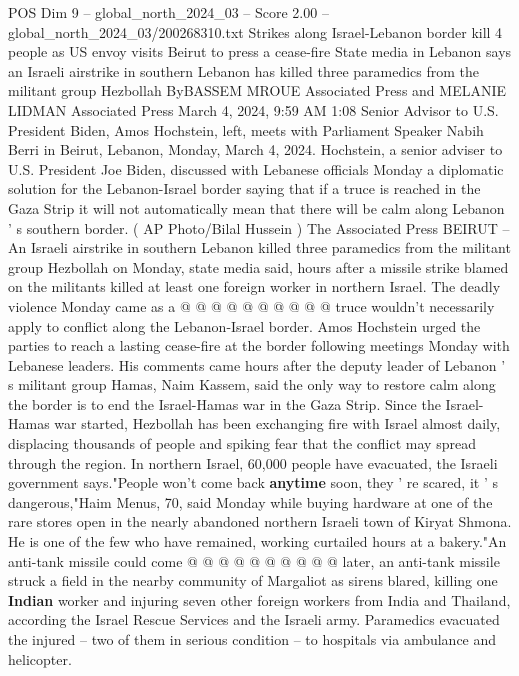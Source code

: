 \begin{textsample}{POS Dim 9 – global\_north\_2024\_03 – Score 2.00 – global\_north\_2024\_03/200268310.txt}  \label{ex:f9_pos_203}
Strikes along Israel-Lebanon border kill 4 people as US envoy visits Beirut to press a cease-fire State media in Lebanon says an Israeli airstrike in southern Lebanon has killed three paramedics from the militant group Hezbollah ByBASSEM MROUE Associated Press and MELANIE LIDMAN Associated Press March 4, 2024, 9:59 AM 1:08 Senior Advisor to U.S.
President Biden, Amos Hochstein, left, meets with Parliament Speaker Nabih Berri in Beirut, Lebanon, Monday, March 4, 2024.
Hochstein, a senior adviser to U.S.
President Joe Biden, discussed with Lebanese officials Monday a diplomatic solution for the Lebanon-Israel border saying that if a truce is reached in the Gaza Strip it will not automatically mean that there will be calm along Lebanon ' s southern border. ( AP Photo/Bilal Hussein ) The Associated Press BEIRUT -- An Israeli airstrike in southern Lebanon killed three paramedics from the militant group Hezbollah on Monday, state media said, hours after a missile strike blamed on the militants killed at least one foreign worker in northern Israel.
The deadly violence Monday came as a @ @ @ @ @ @ @ @ @ @ truce wouldn't necessarily apply to conflict along the Lebanon-Israel border.
Amos Hochstein urged the parties to reach a lasting cease-fire at the border following meetings Monday with Lebanese leaders.
His comments came hours after the deputy leader of Lebanon ' s militant group Hamas, Naim Kassem, said the only way to restore calm along the border is to end the Israel-Hamas war in the Gaza Strip.
Since the Israel-Hamas war started, Hezbollah has been exchanging fire with Israel almost daily, displacing thousands of people and spiking fear that the conflict may spread through the region.
In northern Israel, 60,000 people have evacuated, the Israeli government says."People won't come back \textbf{anytime} soon, they ' re scared, it ' s dangerous,"Haim Menus, 70, said Monday while buying hardware at one of the rare stores open in the nearly abandoned northern Israeli town of Kiryat Shmona.
He is one of the few who have remained, working curtailed hours at a bakery."An anti-tank missile could come @ @ @ @ @ @ @ @ @ @ later, an anti-tank missile struck a field in the nearby community of Margaliot as sirens blared, killing one \textbf{Indian} worker and injuring seven other foreign workers from India and Thailand, according the Israel Rescue Services and the Israeli army.
Paramedics evacuated the injured -- two of them in serious condition -- to hospitals via ambulance and helicopter.

\end{textsample}
